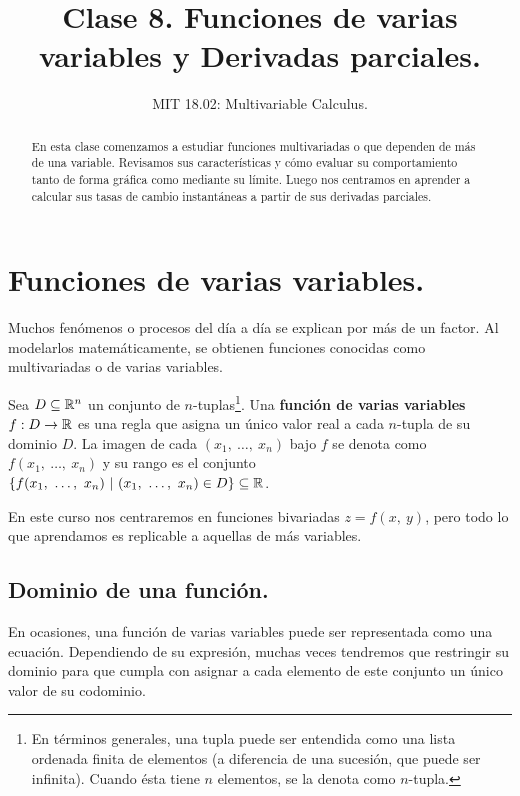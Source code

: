 \documentclass[12pt]{article}
\title{Clase 8. Funciones de varias variables y Derivadas parciales.}
\author{MIT 18.02: Multivariable Calculus.}
\date{}
\begin{document}


\maketitle

\begin{abstract}
\noindent En esta clase comenzamos a estudiar funciones multivariadas o que dependen de más de una variable. Revisamos sus características y cómo evaluar su comportamiento tanto de forma gráfica como mediante su límite. Luego nos centramos en aprender a calcular sus tasas de cambio instantáneas a partir de sus derivadas parciales.
\end{abstract}


\section{Funciones de varias variables.}

Muchos fenómenos o procesos del día a día se explican por más de un factor. Al modelarlos matemáticamente, se obtienen funciones conocidas como multivariadas o de varias variables.

Sea $D \subseteq \mathbb{R}^{n}$ un conjunto de $n$-tuplas\footnote{En términos generales, una tupla puede ser entendida como una lista ordenada finita de elementos (a diferencia de una sucesión, que puede ser infinita). Cuando ésta tiene $n$ elementos, se la denota como $n$-tupla.}. Una \textbf{función de varias variables} $f:D \to \mathbb{R}$ es una regla que asigna un único valor real a cada $n$-tupla de su dominio $D$. La imagen de cada $(x_{1}, \ \ldots, \ x_{n})$ bajo $f$ se denota como $f(x_{1}, \ \ldots, \ x_{n})$ y su rango es el conjunto $\{f(x_{1}, \ \ldots, \ x_{n}) \ | \ (x_{1}, \ \ldots, \ x_{n}) \in D\} \subseteq \R$.

En este curso nos centraremos en funciones bivariadas $z = f(x, \ y)$, pero todo lo que aprendamos es replicable a aquellas de más variables.

\subsection{Dominio de una función.}

En ocasiones, una función de varias variables puede ser representada como una ecuación. Dependiendo de su expresión, muchas veces tendremos que restringir su dominio para que cumpla con asignar a cada elemento de este conjunto un único valor de su codominio.
\end{document}

